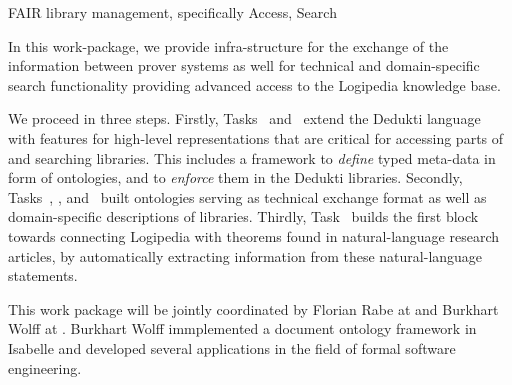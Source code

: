 \begin{workpackage}[id=structuring,wphases=0-48,type=RTD,
  short=Structured Theories and Metadata,%
  title=Structured Theories and Metadata,
  lead=Fau,
  BolRM=10,
  FauRM=51,   %
  SacRM=48]
  



\begin{wpobjectives}
FAIR library management, specifically Access, Search

In this work-package, we provide infra-structure for the exchange of the information between prover systems as
well for technical and domain-specific search functionality providing advanced access to the 
Logipedia knowledge base.
\end{wpobjectives}


\begin{wpdescription}
We proceed in three steps.
Firstly, Tasks~ and~ extend the Dedukti language with features for high-level representations that are critical for accessing parts of and searching libraries.
This includes a framework to \emph{define} typed meta-data in form of ontologies, and to \emph{enforce} them in 
the Dedukti libraries.
Secondly, Tasks~, , and~ built ontologies serving as technical exchange format as well as domain-specific descriptions of libraries.
Thirdly, Task~ builds the first block towards
    connecting Logipedia with theorems found in natural-language
    research articles, by automatically extracting information from these
    natural-language statements.

This work package will be jointly coordinated by Florian Rabe at  and Burkhart Wolff at .
Burkhart Wolff immplemented a document ontology framework in Isabelle and developed several applications
in the field of formal software engineering.
\cite{brucker.ea:ontologies-certification:2019,brucker.ea:isabelle-ontologies:2018,brucker.ea:ontologies-certification:2019} 
\end{wpdescription}


\end{workpackage}
